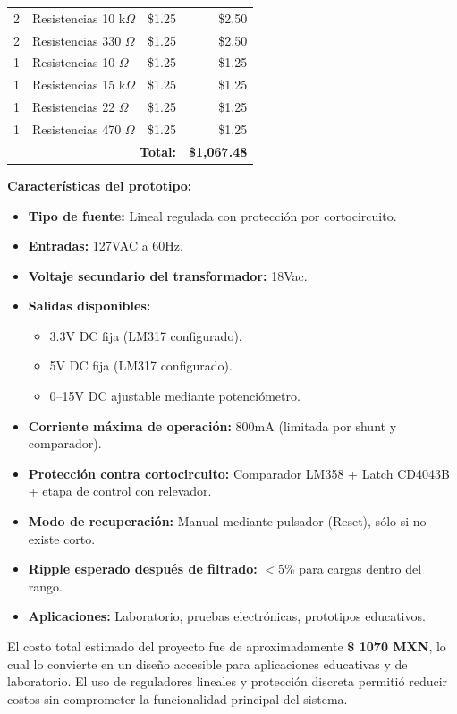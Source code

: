 \documentclass[pdflatex,sn-mathphys-num]{sn-jnl}%
\begin{document}
\begin{table}[htbp]
\begin{tabular}{clrr}
2 & Resistencias 10 k$\Omega$ & \$1.25 & \$2.50 \\
2 & Resistencias 330 $\Omega$ & \$1.25 & \$2.50 \\
1 & Resistencias 10 $\Omega$ & \$1.25 & \$1.25 \\
1 & Resistencias 15 k$\Omega$ & \$1.25 & \$1.25 \\
1 & Resistencias 22 $\Omega$ & \$1.25 & \$1.25 \\
1 & Resistencias 470 $\Omega$ & \$1.25 & \$1.25 \\
\hline
\multicolumn{3}{r}{\textbf{Total:}} & \textbf{\$1,067.48} \\
\hline
\end{tabular}
\end{table}

\noindent\textbf{Características del prototipo:}
\begin{itemize}
    \item \textbf{Tipo de fuente:} Lineal regulada con protección por cortocircuito.
    \item \textbf{Entradas:} 127VAC a 60Hz.
    \item \textbf{Voltaje secundario del transformador:} 18Vac.
    \item \textbf{Salidas disponibles:}
    \begin{itemize}
        \item 3.3V DC fija (LM317 configurado).
        \item 5V DC fija (LM317 configurado).
        \item 0–15V DC ajustable mediante potenciómetro.
    \end{itemize}
    \item \textbf{Corriente máxima de operación:} 800mA (limitada por shunt y comparador).
    \item \textbf{Protección contra cortocircuito:} Comparador LM358 + Latch CD4043B + etapa de control con relevador.
    \item \textbf{Modo de recuperación:} Manual mediante pulsador (Reset), sólo si no existe corto.
    \item \textbf{Ripple esperado después de filtrado:} $<$5\% para cargas dentro del rango.
    \item \textbf{Aplicaciones:} Laboratorio, pruebas electrónicas, prototipos educativos.
\end{itemize}
El costo total estimado del proyecto fue de aproximadamente \textbf{{\$} 1070 MXN}, lo cual lo convierte en un diseño accesible para aplicaciones educativas y de laboratorio. El uso de reguladores lineales y protección discreta permitió reducir costos sin comprometer la funcionalidad principal del sistema.
\end{document}
